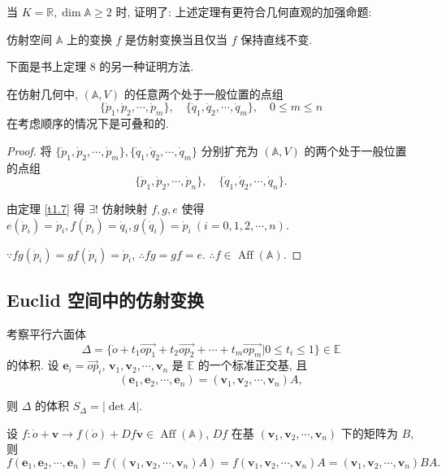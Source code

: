 \documentclass{ctexart}
\begin{document}
当 $K=\mathbb{R},\dim\mathbb{A}\geq2$ 时, \cite[p41]{geometry} 证明了: 上述定理有更符合几何直观的加强命题:
\begin{theorem}
    仿射空间 $\mathbb{A}$ 上的变换 $f$ 是仿射变换当且仅当 $f$ 保持直线不变.
\end{theorem}
下面是书上定理 8 的另一种证明方法.
\begin{theorem}[书上的定理 8]\label{t3.8}
    在仿射几何中, $(\mathbb{A},V)$ 的任意两个处于一般位置的点组
    \[\{\dot{p}_1,\dot{p}_2,\cdots,\dot{p}_m\},\quad\{\dot{q}_1,\dot{q}_2,\cdots,\dot{q}_m\},\quad0\leq m\leq n\]
    在考虑顺序的情况下是可叠和的.
\end{theorem}
\begin{proof}
    将 $\{\dot{p}_1,\dot{p}_2,\cdots,\dot{p}_m\},\{\dot{q}_1,\dot{q}_2,\cdots,\dot{q}_m\}$ 分别扩充为 $(\mathbb{A},V)$ 的两个处于一般位置的点组
    \[\{\dot{p}_1,\dot{p}_2,\cdots,\dot{p}_n\},\quad\{\dot{q}_1,\dot{q}_2,\cdots,\dot{q}_n\}.\]

    由定理 \ref{t1.7} 得 $\exists!$ 仿射映射 $f,g,e$ 使得 $e(\dot{p}_i)=\dot{p}_i,f(\dot{p}_i)=\dot{q}_i,g(\dot{q}_i)=\dot{p}_i\ (i=0,1,2,\cdots,n)$.

    $\because fg(\dot{p}_i)=gf(\dot{p}_i)=\dot{p}_i$, $\therefore fg=gf=e$. $\therefore f\in\operatorname{Aff}(\mathbb{A})$.
\end{proof}
\subsection{Euclid 空间中的仿射变换}
考察平行六面体
\[\Delta=\{\dot{o}+t_1\overrightarrow{op_1}+t_2\overrightarrow{op_2}+\cdots+t_m\overrightarrow{op_m}|0\leq t_i\leq1\}\in\mathbb{E}\]
的体积. 设 $\boldsymbol{e}_i=\overrightarrow{op}_i$, $\boldsymbol{v}_1,\boldsymbol{v}_2,\cdots,\boldsymbol{v}_n$ 是 $\mathbb{E}$ 的一个标准正交基, 且
\[(\boldsymbol{e}_1,\boldsymbol{e}_2,\cdots,\boldsymbol{e}_n)=(\boldsymbol{v}_1,\boldsymbol{v}_2,\cdots,\boldsymbol{v}_n)A,\]

则 $\Delta$ 的体积 $S_\Delta=|\det A|$.

设 $f:\dot{o}+\boldsymbol{v}\to f(\dot{o})+Df\boldsymbol{v}\in\operatorname{Aff}(\mathbb{A})$, $Df$ 在基 $(\boldsymbol{v}_1,\boldsymbol{v}_2,\cdots,\boldsymbol{v}_n)$ 下的矩阵为 $B$, 则
\[f(\boldsymbol{e}_1,\boldsymbol{e}_2,\cdots,\boldsymbol{e}_n)=f((\boldsymbol{v}_1,\boldsymbol{v}_2,\cdots,\boldsymbol{v}_n)A)=f(\boldsymbol{v}_1,\boldsymbol{v}_2,\cdots,\boldsymbol{v}_n)A=(\boldsymbol{v}_1,\boldsymbol{v}_2,\cdots,\boldsymbol{v}_n)BA.\]
\end{document}
